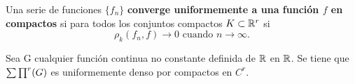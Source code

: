 \begin{definicion}
    Una serie de funciones $\{f_n\}$ \textbf{converge uniformemente a una función $f$ en compactos} si para 
    todos los conjuntos compactos $K \subset \mathbb{R}^r$ si 
    \begin{equation}
        \rho_k (f_n, f) \longrightarrow 0 \text{ cuando } n \longrightarrow \infty.
    \end{equation} 
\end{definicion}

\begin{teorema}   \label{teo:TeoremaConvergenciaRealEnCompactosDefinicionesEsenciales}

    Sea G cualquier función continua no constante definida de $\mathbb{R}$ en $\mathbb{R}$. 
    Se tiene que $\sum \prod^r (G)$ es uniformemente denso por compactos en $C^r$.
\end{teorema}

